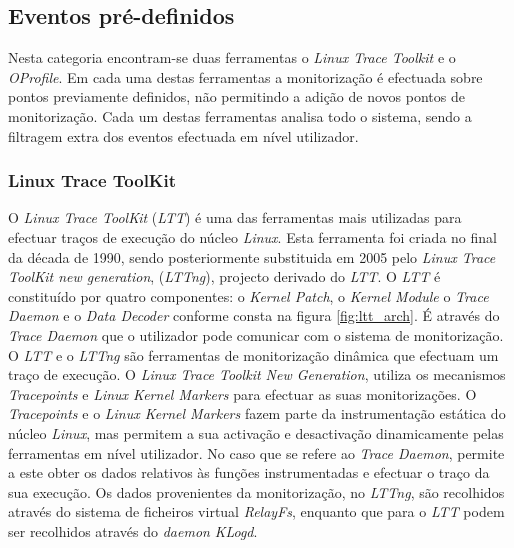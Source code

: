 \subsection{Eventos pré-definidos}

Nesta categoria encontram-se duas ferramentas o \textit{Linux Trace Toolkit} e o \textit{OProfile}.
Em cada uma destas ferramentas a monitorização é efectuada sobre pontos previamente definidos, não permitindo a adição de novos pontos de monitorização.
Cada um destas ferramentas analisa todo o sistema, sendo a filtragem extra dos eventos efectuada em nível utilizador.

\subsubsection{Linux Trace ToolKit}\label{cap:linux_trace_toolkit_overview}


O \textit{Linux Trace ToolKit} (\textit{LTT}) é uma das ferramentas mais utilizadas para efectuar traços de execução do núcleo \textit{Linux}.
Esta ferramenta foi criada no final da década de 1990, sendo posteriormente substituida em 2005 pelo \textit{Linux Trace ToolKit new generation}, (\textit{LTTng}), projecto derivado do \textit{LTT}.
O \textit{LTT} é constituído por quatro componentes: o \textit{Kernel Patch}, o \textit{Kernel Module} o \textit{Trace Daemon} e o \textit{Data Decoder} conforme consta na figura \ref{fig:ltt_arch}.
É através do \textit{Trace Daemon} que o utilizador pode comunicar com o sistema de monitorização.
O \textit{LTT} e o \textit{LTTng} são ferramentas de monitorização dinâmica que efectuam um traço de execução.
O \textit{Linux Trace Toolkit New Generation}, utiliza os mecanismos \textit{Tracepoints}\cite{Mathieu2009} e \textit{Linux Kernel Markers}\cite{Mathieu2009} para efectuar as suas monitorizações.
O \textit{Tracepoints} e o \textit{Linux Kernel Markers} fazem parte da instrumentação estática do núcleo \textit{Linux}, mas permitem a sua activação e desactivação dinamicamente pelas ferramentas em nível utilizador.
No caso que se refere ao \textit{Trace Daemon}, permite a este obter os dados relativos às funções instrumentadas e efectuar o traço da sua execução.
Os dados provenientes da monitorização, no \textit{LTTng}, são recolhidos através do sistema de ficheiros virtual \textit{RelayFs}, enquanto que para o \textit{LTT} podem ser recolhidos através do \textit{daemon} \textit{KLogd}.

